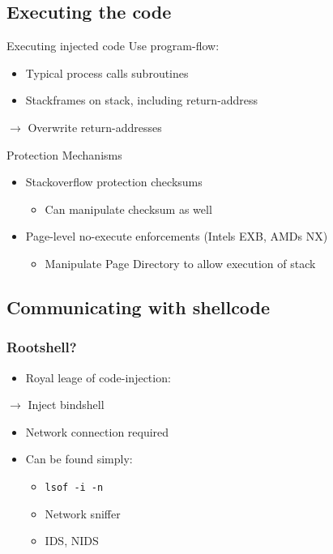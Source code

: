 \documentclass{beamer}
\newenvironment{itemizeframe}[1]
  {\begin{frame}{#1}\startitemizeframe}
  {\stopitemizeframe\end{frame}}
\newcommand\startitemizeframe{\begin{itemize}}
\newcommand\stopitemizeframe{\end{itemize}}
\begin{document}
	\subsection{Executing the code}

		\begin{frame}{Executing injected code}
			Use program-flow:
			\begin{itemize}
				\item Typical process calls subroutines
				\item Stackframes on stack, including return-address
			\end{itemize}
			$\rightarrow$ Overwrite return-addresses
		\end{frame}

		\begin{itemizeframe}{Protection Mechanisms}
			\item Stackoverflow protection checksums
			\begin{itemize}
				\item Can manipulate checksum as well
			\end{itemize}
			\item Page-level no-execute enforcements {\small (Intels EXB, AMDs NX)}
			\begin{itemize}
				\item Manipulate Page Directory to allow execution of stack
			\end{itemize}
		\end{itemizeframe}

	\subsection{Communicating with shellcode}

		\begin{frame} \frametitle{Rootshell?}
			\begin{itemize}
				\item Royal leage of code-injection: 
			\end{itemize}
			$\rightarrow$ Inject bindshell
			\begin{itemize}
				\item Network connection required
				\item Can be found simply:
				\begin{itemize}
					\item \texttt{lsof -i -n}
					\item Network sniffer
					\item IDS, NIDS
				\end{itemize}
			\end{itemize}
		\end{frame}
\end{document}
